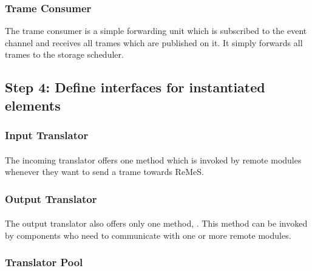 \subsubsection{Trame Consumer}

\npar The trame consumer is a simple forwarding unit which is subscribed to the
event channel and receives all trames which are published on it. It simply
forwards all trames to the storage scheduler.

\subsection{Step 4: Define interfaces for instantiated elements}
\label{add:it2/interfaces}

\subsubsection{Input Translator}

\paragraph{} %

\npar The incoming translator offers one method 
which is invoked by remote modules whenever they want to send a trame towards
ReMeS. 

\subsubsection{Output Translator}

\paragraph{}%

\npar The output translator also offers only one method, .
This method can be invoked by components who need to communicate with one or
more remote modules.

\subsubsection{Translator Pool}

